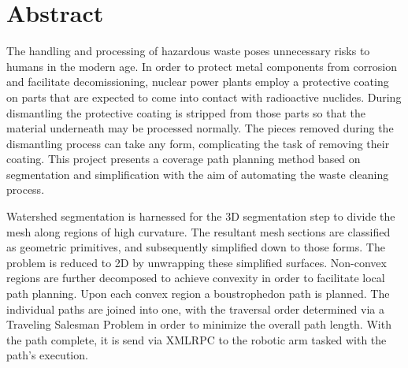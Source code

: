 \section*{Abstract}
The handling and processing of hazardous waste poses unnecessary risks to humans in the modern age.
In order to protect metal components from corrosion and facilitate decomissioning, nuclear power plants employ a protective coating on parts that are expected to come into contact with radioactive nuclides.
During dismantling the protective coating is stripped from those parts so that the material underneath may be processed normally.
The pieces removed during the dismantling process can take any form, complicating the task of removing their coating.
This project presents a coverage path planning method based on segmentation and simplification with the aim of automating the waste cleaning process.

Watershed segmentation is harnessed for the 3D segmentation step to divide the mesh along regions of high curvature.
The resultant mesh sections are classified as geometric primitives, and subsequently simplified down to those forms.
The problem is reduced to 2D by unwrapping these simplified surfaces.
Non-convex regions are further decomposed to achieve convexity in order to facilitate local path planning.
Upon each convex region a boustrophedon path is planned.
The individual paths are joined into one, with the traversal order determined via a Traveling Salesman Problem in order to minimize the overall path length.
With the path complete, it is send via XMLRPC to the robotic arm tasked with the path's execution.

